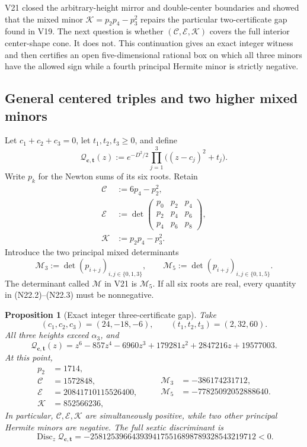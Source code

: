\documentclass[11pt]{article}
\newtheorem{proposition}[theorem]{Proposition}
\theoremstyle{definition}
\theoremstyle{remark}
\begin{document}
V21 closed the arbitrary-height mirror and double-center boundaries and
showed that the mixed minor
\(\mathcal K=p_2p_4-p_3^2\) repairs the particular two-certificate gap
found in V19.  The next question is whether
\((\mathcal C,\mathcal E,\mathcal K)\) covers the full interior
center-shape cone.  It does not.  This continuation gives an exact integer
witness and then certifies an open five-dimensional rational box on which
all three minors have the allowed sign while a fourth principal Hermite
minor is strictly negative.

\subsection{General centered triples and two higher mixed minors}
\label{subsec:f2v22-minors}

Let \(c_1+c_2+c_3=0\), let \(t_1,t_2,t_3\geq0\), and define
\[
 \mathcal Q_{\bm c,\bm t}(z)
 :=e^{-D^2/2}\prod_{j=1}^3\bigl((z-c_j)^2+t_j\bigr).
 \tag{N22.1}
\]
Write \(p_k\) for the Newton sums of its six roots.  Retain
\[
\begin{aligned}
 \mathcal C&:=6p_4-p_2^2,\\
 \mathcal E&:=
 \det\!\begin{pmatrix}
 p_0&p_2&p_4\\
 p_2&p_4&p_6\\
 p_4&p_6&p_8
 \end{pmatrix},\\
 \mathcal K&:=p_2p_4-p_3^2.
\end{aligned}
\tag{N22.2}
\]
Introduce the two principal mixed determinants
\[
 \mathcal M_3:=
 \det(p_{i+j})_{i,j\in\{0,1,3\}},
 \qquad
 \mathcal M_5:=
 \det(p_{i+j})_{i,j\in\{0,1,5\}}.
 \tag{N22.3}
\]
The determinant called \(\mathcal M\) in V21 is \(\mathcal M_5\).
If all six roots are real, every quantity in
\textup{(N22.2)}--\textup{(N22.3)} must be nonnegative.

\begin{proposition}[Exact integer three-certificate gap]
\label{prop:f2v22-integer-gap}
Take
\[
 (c_1,c_2,c_3)=(24,-18,-6),
 \qquad
 (t_1,t_2,t_3)=(2,32,60).
 \tag{N22.4}
\]
All three heights exceed \(\alpha_3\), and
\[
 \mathcal Q_{\bm c,\bm t}(z)
 =z^6-857z^4-6960z^3+179281z^2
   +2847216z+19577003.
 \tag{N22.5}
\]
At this point,
\[
\begin{aligned}
 p_2&=1714,\\
 \mathcal C&=1572848,\\
 \mathcal E&=20841710115526400,\\
 \mathcal K&=852566236,
\end{aligned}
\qquad
\begin{aligned}
 \mathcal M_3&=-386174231712,\\
 \mathcal M_5&=-77825092052888640.
\end{aligned}
\tag{N22.6}
\]
In particular, \(\mathcal C,\mathcal E,\mathcal K\) are simultaneously
positive, while two other principal Hermite minors are negative.  The full
sextic discriminant is
\[
 \operatorname{Disc}_z\mathcal Q_{\bm c,\bm t}
 =-2581253966439394175516898789328543219712<0.
 \tag{N22.7}
\]
\end{proposition}
\end{document}
